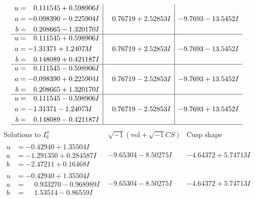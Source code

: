 \documentclass[1p]{elsarticle_modified}
\theoremstyle{definition}
\newcommand{\I}{\sqrt{-1}}
\begin{document}
$$\begin{array}{c|c|c}
\begin{aligned}
u &= \phantom{-}0.111545 + 0.598906 I \\
a &= -0.098390 - 0.225904 I \\
b &= \phantom{-}0.208665 - 1.320170 I\end{aligned}
 & \phantom{-}0.76719 + 2.52853 I & -9.7693 - 13.5452 I \\ \hline\begin{aligned}
u &= \phantom{-}0.111545 + 0.598906 I \\
a &= -1.31371 + 1.24073 I \\
b &= \phantom{-}0.148089 + 0.421187 I\end{aligned}
 & \phantom{-}0.76719 + 2.52853 I & -9.7693 - 13.5452 I \\ \hline\begin{aligned}
u &= \phantom{-}0.111545 - 0.598906 I \\
a &= -0.098390 + 0.225904 I \\
b &= \phantom{-}0.208665 + 1.320170 I\end{aligned}
 & \phantom{-}0.76719 - 2.52853 I & -9.7693 + 13.5452 I \\ \hline\begin{aligned}
u &= \phantom{-}0.111545 - 0.598906 I \\
a &= -1.31371 - 1.24073 I \\
b &= \phantom{-}0.148089 - 0.421187 I\end{aligned}
 & \phantom{-}0.76719 - 2.52853 I & -9.7693 + 13.5452 I\\
 \hline 
 \end{array}$$\newpage$$\begin{array}{c|c|c}  
\text{Solutions to }I^u_{6}& \I (\text{vol} + \sqrt{-1}CS) & \text{Cusp shape}\\
 \hline 
\begin{aligned}
u &= -0.42940 + 1.35504 I \\
a &= -1.291350 + 0.284587 I \\
b &= -2.47211 + 0.16468 I\end{aligned}
 & -9.65304 - 8.50275 I & -4.64372 + 5.74713 I \\ \hline\begin{aligned}
u &= -0.42940 + 1.35504 I \\
a &= \phantom{-}0.933270 - 0.968989 I \\
b &= \phantom{-}1.53514 - 0.86559 I\end{aligned}
 & -9.65304 - 8.50275 I & -4.64372 + 5.74713 I \\ \hline\begin{aligned}

\end{aligned}
\end{array}$$
\end{document}
